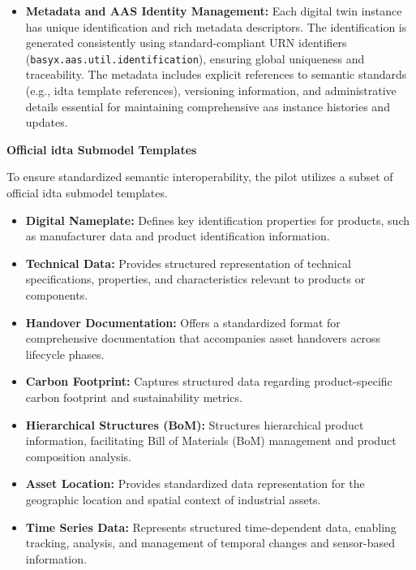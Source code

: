 \begin{itemize}[itemsep=0.5\baselineskip]
    \item \textbf{Metadata and AAS Identity Management:} Each digital twin instance has unique identification and rich metadata descriptors. The identification is generated consistently using standard-compliant URN identifiers (\verb|basyx.aas.util.identification|), ensuring global uniqueness and traceability. The metadata includes explicit references to semantic standards (e.g., \ac{idta} template references), versioning information, and administrative details essential for maintaining comprehensive \ac{aas} instance histories and updates.
\end{itemize}

\textbf{Official \ac{idta} Submodel Templates}

To ensure standardized semantic interoperability, the pilot utilizes a subset of official \ac{idta} submodel templates.

\begin{itemize}[itemsep=0.5\baselineskip]
    \item \textbf{Digital Nameplate:} Defines key identification properties for products, such as manufacturer data and product identification information. \autocite{IDTA.2024g}
    
    \item \textbf{Technical Data:} Provides structured representation of technical specifications, properties, and characteristics relevant to products or components. \autocite{IDTA.2024b}

    \item \textbf{Handover Documentation:} Offers a standardized format for comprehensive documentation that accompanies asset handovers across lifecycle phases. \autocite{IDTA.2023b}

    \item \textbf{Carbon Footprint:} Captures structured data regarding product-specific carbon footprint and sustainability metrics. \autocite{IDTA.2024e}

    \item \textbf{Hierarchical Structures (BoM):} Structures hierarchical product information, facilitating Bill of Materials (BoM) management and product composition analysis. \autocite{IDTA.2024f}

    \item \textbf{Asset Location:} Provides standardized data representation for the geographic location and spatial context of industrial assets. \autocite{IDTA.2024d}

    \item \textbf{Time Series Data:} Represents structured time-dependent data, enabling tracking, analysis, and management of temporal changes and sensor-based information. \autocite{IDTA.2023}
\end{itemize}

